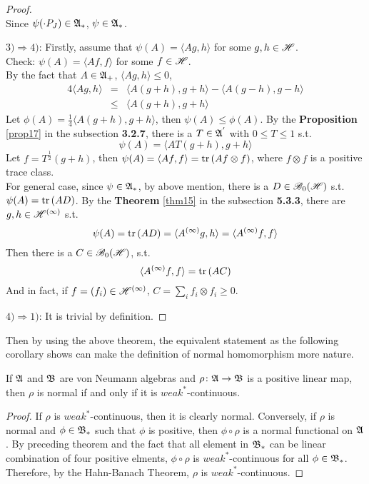\begin{proof}
\begin{equation*}
	\end{equation*}
	Since $\psi(\cdot P_J) \in \mathfrak{A}_*$, $\psi \in \mathfrak{A}_*$.
	\item $3) \Rightarrow 4)$: Firstly, assume that $\psi(A) = \langle Ag,h \rangle$ for some $g,h \in \mathscr{H}$. \\
	Check: $\psi(A) = \langle Af, f \rangle$ for some $f \in \mathscr{H}$. \\
	By the fact that $A \in \mathfrak{A}_+$, $\langle Ag,h \rangle \leqslant 0$, 
	\begin{eqnarray*}
		4\langle Ag,h \rangle &=& \langle A(g+h),g+h \rangle - \langle A(g-h),g-h \rangle \\
		&\leqslant& \langle A(g+h),g+h \rangle
	\end{eqnarray*}
	Let $\phi(A) = \frac{1}{4}\langle A(g+h),g+h \rangle$, then $\psi(A) \leqslant \phi(A)$. By the \textbf{Proposition} \ref{prop17} in the subsection \textbf{3.2.7}, there is a $T \in \mathfrak{A}^{'}$ with $0 \leqslant T \leqslant 1$ s.t. 
	\begin{equation*}
		\psi(A) =  \langle AT(g+h),g+h \rangle
	\end{equation*}
	Let $f = T^{\frac{1}{2}}(g+h)$, then $\psi(A) = \langle Af, f \rangle =  \operatorname{tr}{(Af \otimes f)}$, where $f \otimes f$ is a positive trace class. \\
	For general case, since $\psi \in \mathfrak{A}_*$, by above mention, there is a $D \in \mathscr{B}_{0}\mathscr{(H)}$ s.t. $\psi(A) = \operatorname{tr}{(AD)}$. By the \textbf{Theorem} \ref{thm15} in the subsection \textbf{5.3.3}, there are $g, h \in \mathscr{H}^{(\infty)}$  s.t.
	\begin{equation*}
		\psi(A)  = \operatorname{tr}{(AD)} = \langle A^{(\infty)}g,h \rangle = \langle A^{(\infty)}f,f \rangle
	\end{equation*} 
	Then there is a $C \in \mathscr{B}_{0}\mathscr{(H)}$, s.t.
	\begin{equation*}
		\langle A^{(\infty)}f,f \rangle = \operatorname{tr}{(AC)}
	\end{equation*}
	And in fact, if $f = (f_i) \in \mathscr{H}^{(\infty)}$, $C = \sum_i f_i \otimes f_i \geqslant 0$.
	\item $4) \Rightarrow 1)$: It is trivial by definition.
\end{proof}

Then by using the above theorem, the equivalent statement as the following corollary shows can make the definition of normal homomorphism more nature.

\begin{cor}
	If $\mathfrak{A}$ and $\mathfrak{B}$ are von Neumann algebras and $\rho \colon \mathfrak{A} \rightarrow \mathfrak{B}$ is a positive linear map, then $\rho$ is normal if and only if it is $weak^*$-continuous. 
\end{cor}
\begin{proof}
	If $\rho$ is $weak^*$-continuous, then it is clearly normal. Conversely, if $\rho$ is normal and $\phi \in \mathfrak{B}_*$ such that $\phi$ is positive, then $\phi \circ  \rho$ is a normal functional on $\mathfrak{A}$. By preceding theorem and the fact that all element in $\mathfrak{B}_*$ can be linear combination of four positive elments, $\phi \circ  \rho$ is $weak^*$-continuous for all $\phi \in \mathfrak{B}_*$. Therefore, by the Hahn-Banach Theorem, $\rho$ is $weak^*$-continuous.
\end{proof}

